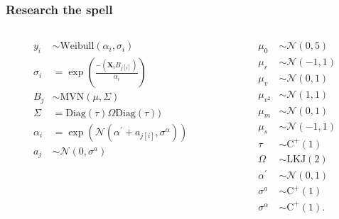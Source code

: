 \documentclass{beamer}
\begin{document}
\begin{frame}
  \frametitle{Research the spell}

  \begin{columns}
    \begin{column}{0.5\textwidth}
      \begin{equation*}
        \begin{aligned}
          y_{i} &\sim \mathrm{Weibull}(\alpha_{i}, \sigma_{i}) \\
          \sigma_{i} &= \exp\left(\frac{-(\mathbf{X}_{i} B_{j[i]})}{\alpha_{i}}\right) \\
          B_{j} &\sim \mathrm{MVN}(\mu, \Sigma) \\
          \Sigma &= \text{Diag}(\tau) \Omega \text{Diag}(\tau)) \\
          \alpha_{i} &= \exp\left(\mathcal{N}(\alpha^{\prime} + a_{j[i]}, \sigma^{\alpha})\right) \\
          a_{j} &\sim \mathcal{N}(0, \sigma^{a}) \\
        \end{aligned}
      \end{equation*}
    \end{column}
    \begin{column}{0.5\textwidth}
      \begin{equation*}
        \begin{aligned}
          \mu_{0} &\sim \mathcal{N}(0, 5) \\
          \mu_{r} &\sim \mathcal{N}(-1, 1) \\
          \mu_{v} &\sim \mathcal{N}(0, 1) \\
          \mu_{v^{2}} &\sim \mathcal{N}(1, 1) \\
          \mu_{m} &\sim \mathcal{N}(0, 1) \\
          \mu_{s} &\sim \mathcal{N}(-1, 1) \\
          \tau &\sim \mathrm{C^{+}}(1) \\
          \Omega &\sim \text{LKJ}(2) \\
          \alpha^{\prime} &\sim \mathcal{N}(0, 1) \\
          \sigma^{a} &\sim \mathrm{C^{+}}(1) \\
          \sigma^{\alpha} &\sim \mathrm{C^{+}}(1). \\
        \end{aligned}
      \end{equation*}
    \end{column}
  \end{columns}
\end{frame}
\end{document}
